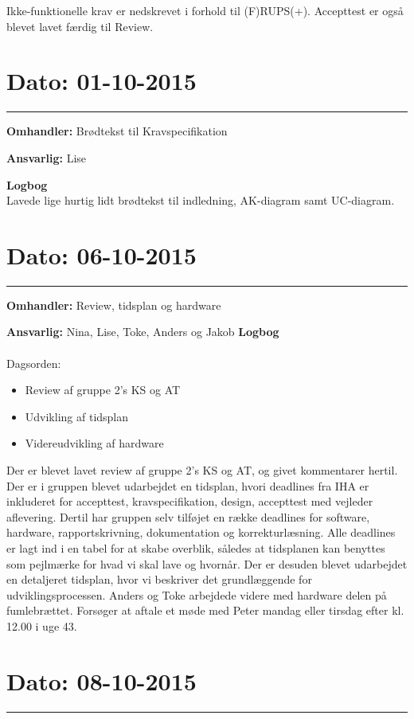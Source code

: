 Ikke-funktionelle krav er nedskrevet i forhold til (F)RUPS(+). Accepttest er også blevet lavet færdig til Review. 

\section{Dato: 01-10-2015 }
\hrule

\textbf{Omhandler:} Brødtekst til Kravspecifikation 

\textbf{Ansvarlig:} Lise 

\textbf{Logbog}
\\
Lavede lige hurtig lidt brødtekst til indledning, AK-diagram samt UC-diagram. 




\section{Dato: 06-10-2015 }
\hrule

\textbf{Omhandler:} Review, tidsplan og hardware  

\textbf{Ansvarlig:} Nina, Lise, Toke, Anders og Jakob
\textbf{Logbog}
\\
\\
Dagsorden:
\begin{itemize}
	\item Review af gruppe 2's KS og AT
	\item Udvikling af tidsplan
	\item Videreudvikling af hardware
\end{itemize}

Der er blevet lavet review af gruppe 2's KS og AT, og givet kommentarer hertil. 
Der er i gruppen blevet udarbejdet en tidsplan, hvori deadlines fra IHA er inkluderet for accepttest, kravspecifikation, design, accepttest med vejleder aflevering. Dertil har gruppen selv tilføjet en række deadlines for software, hardware, rapportskrivning, dokumentation og korrekturlæsning. Alle deadlines er lagt ind i en tabel for at skabe overblik, således at tidsplanen kan benyttes som pejlmærke for hvad vi skal lave og hvornår.
Der er desuden blevet udarbejdet en detaljeret tidsplan, hvor vi beskriver det grundlæggende for udviklingsprocessen.
Anders og Toke arbejdede videre med hardware delen på fumlebrættet.
Forsøger at aftale et møde med Peter mandag eller tirsdag efter kl. 12.00 i uge 43.


\section{Dato: 08-10-2015 }
\hrule

